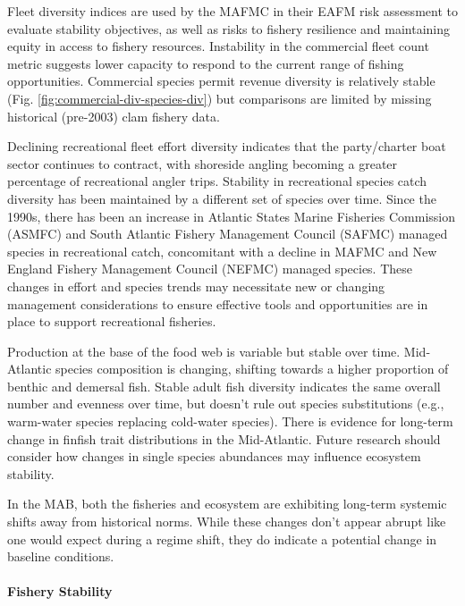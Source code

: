 \documentclass[
  10pt,
]{article}
\begin{document}
Fleet diversity indices are used by the MAFMC in their EAFM risk assessment to evaluate stability objectives, as well as risks to fishery resilience and maintaining equity in access to fishery resources. Instability in the commercial fleet count metric suggests lower capacity to respond to the current range of fishing opportunities. Commercial species permit revenue diversity is relatively stable (Fig. \ref{fig:commercial-div-species-div}) but comparisons are limited by missing historical (pre-2003) clam fishery data.

Declining recreational fleet effort diversity indicates that the party/charter boat sector continues to contract, with shoreside angling becoming a greater percentage of recreational angler trips. Stability in recreational species catch diversity has been maintained by a different set of species over time. Since the 1990s, there has been an increase in Atlantic States Marine Fisheries Commission (ASMFC) and South Atlantic Fishery Management Council (SAFMC) managed species in recreational catch, concomitant with a decline in MAFMC and New England Fishery Management Council (NEFMC) managed species. These changes in effort and species trends may necessitate new or changing management considerations to ensure effective tools and opportunities are in place to support recreational fisheries.

Production at the base of the food web is variable but stable over time. Mid-Atlantic species composition is changing, shifting towards a higher proportion of benthic and demersal fish. Stable adult fish diversity indicates the same overall number and evenness over time, but doesn't rule out species substitutions (e.g., warm-water species replacing cold-water species). There is evidence for long-term change in finfish trait distributions in the Mid-Atlantic. Future research should consider how changes in single species abundances may influence ecosystem stability.

In the MAB, both the fisheries and ecosystem are exhibiting long-term systemic shifts away from historical norms. While these changes don't appear abrupt like one would expect during a regime shift, they do indicate a potential change in baseline conditions.

\paragraph{Fishery Stability}\label{fishery-stability-1}
\end{document}
